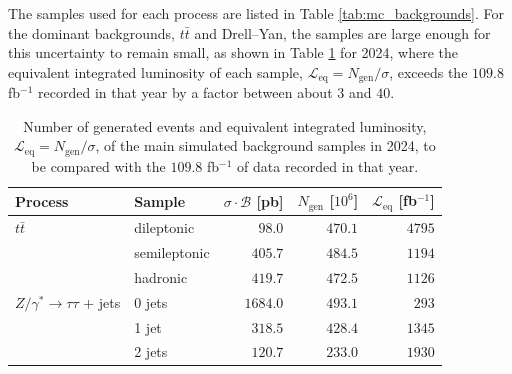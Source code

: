 The samples used for each process are listed in Table \ref{tab:mc_backgrounds}. For the dominant backgrounds, $t\bar{t}$ and Drell--Yan, the samples are large enough for this uncertainty to remain small, as shown in Table \ref{tab:mc_stats_2024} for 2024, where the equivalent integrated luminosity of each sample, $\mathcal{L}_\text{eq} = N_\text{gen}/\sigma$, exceeds the $109.8$ fb$^{-1}$ recorded in that year by a factor between about $3$ and $40$.\bigskip
\begin{table}[tbp]
\centering
\small
\begin{tabular}{@{}llrrr@{}}
\toprule
Process & Sample & $\sigma\cdot\mathcal{B}$ [pb] & $N_\text{gen}$ [$10^6$] & $\mathcal{L}_\text{eq}$ [fb$^{-1}$] \\
\midrule
$t\bar{t}$ & dileptonic   & $98.0$  & $470.1$ & $4795$ \\
           & semileptonic & $405.7$ & $484.5$ & $1194$ \\
           & hadronic     & $419.7$ & $472.5$ & $1126$ \\
\midrule
$Z/\gamma^{*}\to\tau\tau$ + jets & 0 jets & $1684.0$ & $493.1$ & $293$ \\
                                 & 1 jet  & $318.5$  & $428.4$ & $1345$ \\
                                 & 2 jets & $120.7$  & $233.0$ & $1930$ \\
\bottomrule
\end{tabular}
\caption[Size of the main simulated background samples in 2024]{Number of generated events and equivalent integrated luminosity, $\mathcal{L}_\text{eq} = N_\text{gen}/\sigma$, of the main simulated background samples in 2024, to be compared with the $109.8$ fb$^{-1}$ of data recorded in that year.}
\label{tab:mc_stats_2024}
\end{table}


